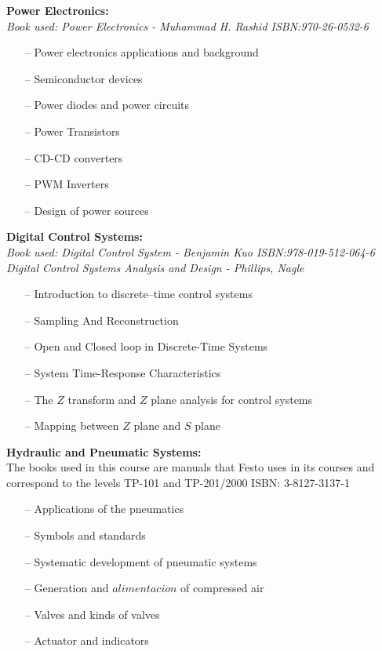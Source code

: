 \documentclass{article}
\begin{document}
\textbf{Power Electronics:}\\
    \emph{Book used: Power Electronics - Muhammad H. Rashid ISBN:970-26-0532-6}
     \begin{itemize}
     \setlength\itemsep{0pt}
        \item[--] Power electronics applications and background
        \item[--] Semiconductor devices
        \item[--] Power diodes and power circuits
        \item[--] Power Transistors
        \item[--] CD-CD converters
        \item[--] PWM Inverters
        \item[--] Design of power sources
    \end{itemize}

\textbf{Digital Control Systems:}\\
    \emph{Book used: Digital Control System - Benjamin Kuo ISBN:978-019-512-064-6}\\
    \emph{    Digital Control Systems Analysis and Design - Phillips, Nagle}
    \begin{itemize}
     \setlength\itemsep{0pt}
        \item[--] Introduction to discrete--time control systems
        \item[--] Sampling And Reconstruction
        \item[--] Open and Closed loop in Discrete-Time Systems
        \item[--] System Time-Response Characteristics
        \item[--] The $Z$ transform and $Z$ plane analysis for control systems
        \item[--] Mapping between $Z$ plane and $S$ plane
    \end{itemize}

\textbf{Hydraulic and Pneumatic Systems:}\\
    The books used in this course are manuals that Festo uses in its courses
    and correspond to the levels TP-101 and TP-201/2000 ISBN: 3-8127-3137-1
    \begin{itemize}
     \setlength\itemsep{0pt}
        \item[--] Applications of the pneumatics
        \item[--] Symbols and standards
        \item[--] Systematic development of  pneumatic systems
        \item[--] Generation and $alimentacion$ of compressed air
        \item[--] Valves and kinds of valves
        \item[--] Actuator and indicators
    \end{itemize}
\end{document}
